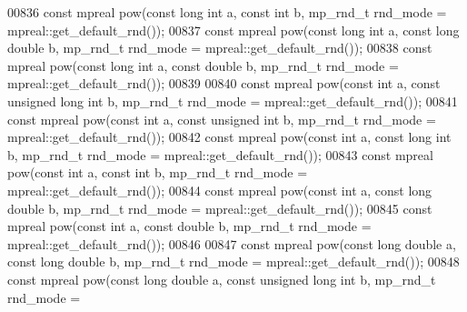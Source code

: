 \begin{DoxyCode}
00836 \textcolor{keyword}{const} mpreal pow(\textcolor{keyword}{const} \textcolor{keywordtype}{long} \textcolor{keywordtype}{int} a, \textcolor{keyword}{const} \textcolor{keywordtype}{int} b, mp\_rnd\_t rnd\_mode = mpreal::get\_default\_rnd());
00837 \textcolor{keyword}{const} mpreal pow(\textcolor{keyword}{const} \textcolor{keywordtype}{long} \textcolor{keywordtype}{int} a, \textcolor{keyword}{const} \textcolor{keywordtype}{long} \textcolor{keywordtype}{double} b, mp\_rnd\_t rnd\_mode = mpreal::get\_default\_rnd());
00838 \textcolor{keyword}{const} mpreal pow(\textcolor{keyword}{const} \textcolor{keywordtype}{long} \textcolor{keywordtype}{int} a, \textcolor{keyword}{const} \textcolor{keywordtype}{double} b, mp\_rnd\_t rnd\_mode = mpreal::get\_default\_rnd());
00839 
00840 \textcolor{keyword}{const} mpreal pow(\textcolor{keyword}{const} \textcolor{keywordtype}{int} a, \textcolor{keyword}{const} \textcolor{keywordtype}{unsigned} \textcolor{keywordtype}{long} \textcolor{keywordtype}{int} b, mp\_rnd\_t rnd\_mode = mpreal::get\_default\_rnd());
00841 \textcolor{keyword}{const} mpreal pow(\textcolor{keyword}{const} \textcolor{keywordtype}{int} a, \textcolor{keyword}{const} \textcolor{keywordtype}{unsigned} \textcolor{keywordtype}{int} b, mp\_rnd\_t rnd\_mode = mpreal::get\_default\_rnd());
00842 \textcolor{keyword}{const} mpreal pow(\textcolor{keyword}{const} \textcolor{keywordtype}{int} a, \textcolor{keyword}{const} \textcolor{keywordtype}{long} \textcolor{keywordtype}{int} b, mp\_rnd\_t rnd\_mode = mpreal::get\_default\_rnd());
00843 \textcolor{keyword}{const} mpreal pow(\textcolor{keyword}{const} \textcolor{keywordtype}{int} a, \textcolor{keyword}{const} \textcolor{keywordtype}{int} b, mp\_rnd\_t rnd\_mode = mpreal::get\_default\_rnd());
00844 \textcolor{keyword}{const} mpreal pow(\textcolor{keyword}{const} \textcolor{keywordtype}{int} a, \textcolor{keyword}{const} \textcolor{keywordtype}{long} \textcolor{keywordtype}{double} b, mp\_rnd\_t rnd\_mode = mpreal::get\_default\_rnd());
00845 \textcolor{keyword}{const} mpreal pow(\textcolor{keyword}{const} \textcolor{keywordtype}{int} a, \textcolor{keyword}{const} \textcolor{keywordtype}{double} b, mp\_rnd\_t rnd\_mode = mpreal::get\_default\_rnd());
00846 
00847 \textcolor{keyword}{const} mpreal pow(\textcolor{keyword}{const} \textcolor{keywordtype}{long} \textcolor{keywordtype}{double} a, \textcolor{keyword}{const} \textcolor{keywordtype}{long} \textcolor{keywordtype}{double} b, mp\_rnd\_t rnd\_mode = mpreal::get\_default\_rnd());
00848 \textcolor{keyword}{const} mpreal pow(\textcolor{keyword}{const} \textcolor{keywordtype}{long} \textcolor{keywordtype}{double} a, \textcolor{keyword}{const} \textcolor{keywordtype}{unsigned} \textcolor{keywordtype}{long} \textcolor{keywordtype}{int} b, mp\_rnd\_t rnd\_mode = 

\end{DoxyCode}
